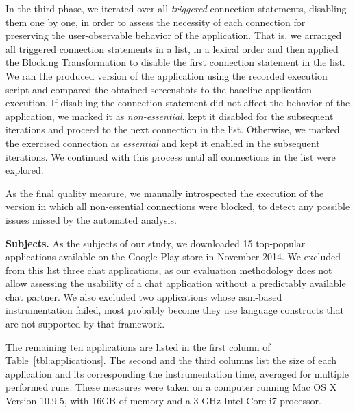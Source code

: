 In the third phase, we iterated over all \emph{triggered} connection statements, disabling them one by one, in order to assess
the necessity of each connection for preserving the user-observable behavior of the application. 
That is, we arranged all triggered connection statements in a list, in a lexical order and then applied the Blocking Transformation to disable the first connection statement in the list.   
We ran the produced version of the application using the recorded execution script and compared the obtained screenshots to the baseline application execution. If disabling the connection statement did not affect the behavior of the application, we marked it as \emph{non-essential}, kept it disabled for the subsequent iterations and proceed to the next connection in the list.
Otherwise, we marked the exercised connection as \emph{essential} and kept it enabled in the subsequent iterations.
We continued with this process until all connections in the list were explored.

As the final quality measure, we manually introspected the execution of the version in which all non-essential connections
were blocked, to detect any  possible issues missed by the automated analysis.



\vspace{0.1in}
\noindent 
{\bf Subjects.} 
As the subjects of our study, we downloaded 15 top-popular applications available on the Google Play store in November 2014. 
We excluded from this list three chat applications, as our evaluation methodology does not allow assessing the usability of a chat application without a predictably available chat partner. 
We also excluded two applications whose asm-based instrumentation failed, most probably become they use language constructs that are not supported by that framework.

The remaining ten applications are listed in the first column of Table~\ref{tbl:applications}.
The second and the third columns list the size of each application and its corresponding the instrumentation time, averaged for multiple performed runs. These measures were taken on a computer running Mac OS X Version 10.9.5, with 16GB of memory and a 3 GHz Intel Core i7 processor.  

